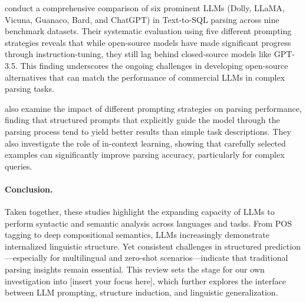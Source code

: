 \citet{sun-etal-2023-battle} conduct a comprehensive comparison of six prominent LLMs (Dolly, LLaMA, Vicuna, Guanaco, Bard, and ChatGPT) in Text-to-SQL parsing across nine benchmark datasets. Their systematic evaluation using five different prompting strategies reveals that while open-source models have made significant progress through instruction-tuning, they still lag behind closed-source models like GPT-3.5. This finding underscores the ongoing challenges in developing open-source alternatives that can match the performance of commercial LLMs in complex parsing tasks.

\citet{liu2023llm} also examine the impact of different prompting strategies on parsing performance, finding that structured prompts that explicitly guide the model through the parsing process tend to yield better results than simple task descriptions. They also investigate the role of in-context learning, showing that carefully selected examples can significantly improve parsing accuracy, particularly for complex queries.

\paragraph{Conclusion.}
Taken together, these studies highlight the expanding capacity of LLMs to perform syntactic and semantic analysis across languages and tasks. From POS tagging to deep compositional semantics, LLMs increasingly demonstrate internalized linguistic structure. Yet consistent challenges in structured prediction—especially for multilingual and zero-shot scenarios—indicate that traditional parsing insights remain essential. This review sets the stage for our own investigation into [insert your focus here], which further explores the interface between LLM prompting, structure induction, and linguistic generalization.

